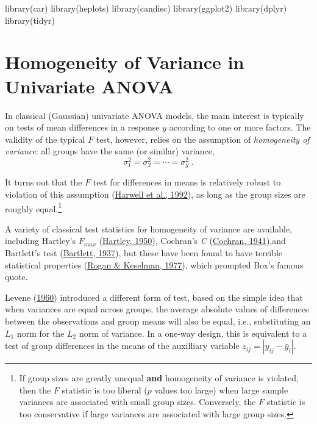 \documentclass[
  letterpaper,
  10pt,
  krantz2]{krantz}
\makeatletter
\newenvironment{Shaded}{\begin{snugshade}}{\end{snugshade}}
\newcommand{\FunctionTok}[1]{\textcolor[rgb]{0.28,0.35,0.67}{#1}}
\newcommand{\NormalTok}[1]{\textcolor[rgb]{0.00,0.23,0.31}{#1}}
\newenvironment{kframe}{%
  \medskip{}
  \setlength{\fboxsep}{.8em}
  \def\at@end@of@kframe{}%
  \ifinner\ifhmode%
  \def\at@end@of@kframe{\end{minipage}}%
  \begin{minipage}{\columnwidth}%
  \fi\fi%
  \def\FrameCommand##1{\hskip\@totalleftmargin \hskip-\fboxsep
  \colorbox{shadecolor}{##1}\hskip-\fboxsep
      \hskip-\linewidth \hskip-\@totalleftmargin \hskip\columnwidth}%
  \MakeFramed {\advance\hsize-\width
    \@totalleftmargin\z@ \linewidth\hsize
    \@setminipage}}%
{\par\unskip\endMakeFramed%
  \at@end@of@kframe}
\renewenvironment{Shaded}{\begin{kframe}}{\end{kframe}}
\makeatother
\begin{document}
\begin{Shaded}
\begin{Highlighting}[]
\FunctionTok{library}\NormalTok{(car)}
\FunctionTok{library}\NormalTok{(heplots)}
\FunctionTok{library}\NormalTok{(candisc)}
\FunctionTok{library}\NormalTok{(ggplot2)}
\FunctionTok{library}\NormalTok{(dplyr)}
\FunctionTok{library}\NormalTok{(tidyr)}
\end{Highlighting}
\end{Shaded}

\hypertarget{sec-homogeneity-ANOVA}{%
\section{Homogeneity of Variance in Univariate
ANOVA}\label{sec-homogeneity-ANOVA}}

In classical (Gaussian) univariate ANOVA models, the main interest is
typically on tests of mean differences in a response \(y\) according to
one or more factors. The validity of the typical \(F\) test, however,
relies on the assumption of \emph{homogeneity of variance}: all groups
have the same (or similar) variance, \[
\sigma_1^2 = \sigma_2^2 = \cdots = \sigma_g^2 \; .
\]

It turns out that the \(F\) test for differences in means is relatively
robust to violation of this assumption
(\protect\hyperlink{ref-Harwell:1992}{Harwell et al., 1992}), as long as
the group sizes are roughly equal.\footnote{If group sizes are greatly
  unequal \textbf{and} homogeneity of variance is violated, then the
  \(F\) statistic is too liberal (\(p\) values too large) when large
  sample variances are associated with small group sizes. Conversely,
  the \(F\) statistic is too conservative if large variances are
  associated with large group sizes.}

A variety of classical test statistics for homogeneity of variance are
available, including Hartley's \(F_{max}\)
(\protect\hyperlink{ref-Hartley:1950}{Hartley, 1950}), Cochran's
\emph{C} (\protect\hyperlink{ref-Cochran:1941}{Cochran, 1941}),and
Bartlett's test (\protect\hyperlink{ref-Bartlett:1937}{Bartlett, 1937}),
but these have been found to have terrible statistical properties
(\protect\hyperlink{ref-Rogan:1977}{Rogan \& Keselman, 1977}), which
prompted Box's famous quote.

Levene (\protect\hyperlink{ref-Levene:1960}{1960}) introduced a
different form of test, based on the simple idea that when variances are
equal across groups, the average absolute values of differences between
the observations and group means will also be equal, i.e., substituting
an \(L_1\) norm for the \(L_2\) norm of variance. In a one-way design,
this is equivalent to a test of group differences in the means of the
auxilliary variable \(z_{ij} = | y_{ij} - \bar{y}_i |\).
\end{document}
